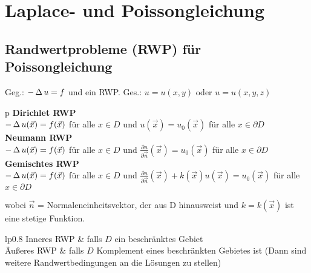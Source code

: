 \documentclass[german,color,5pt]{latex4ei/latex4ei_fs}
\begin{document}
\section{Laplace- und Poissongleichung}
\begin{sectionbox}
	\subsection{Randwertprobleme (RWP) für Poissongleichung}
	\begin{flushleft}
	Geg.: $-\operatorname{\Delta} u = f$ und ein RWP. Ges.: $u=u(x,y)$ oder $u=u(x,y,z)$
	\end{flushleft}
	\begin{tablebox}{p{\textwidth}}
		\textbf{Dirichlet RWP}\\
		$-\operatorname{\Delta} u(\vec x)=f(\vec x) $ für alle $x \in D $ und $u(\vec x)=u_{0}(\vec x) $ für alle $x \in \partial D$ \\
		\textbf{Neumann RWP}\\
		$-\operatorname{\Delta} u(\vec x)=f(\vec x) $ für alle $x \in D $ und $\frac{\partial u}{\partial \vec n}(\vec x)=u_{0}(\vec x) $ für alle $x \in \partial D $ \\
		\textbf{Gemischtes RWP} \\
		$-\operatorname{\Delta} u(\vec x)=f(\vec x) $ für alle $x \in D $ und $\frac{\partial u}{\partial \vec n}(\vec x)+k(\vec x)u(\vec x)=u_{0}(\vec x) $ für alle $x \in \partial D $ \\
	\end{tablebox}
	wobei $\vec n$ = Normaleneinheitsvektor, der aus D hinausweist und $k=k(\vec x)$ ist eine stetige Funktion.
	\begin{tablebox}{lp{0.8\textwidth}}
		Inneres RWP & falls $D$ ein beschränktes Gebiet \\
		Äußeres RWP & falls $D$ Komplement eines beschränkten Gebietes ist (Dann sind weitere Randwertbedingungen an die Lösungen zu stellen)
	\end{tablebox}
\end{sectionbox}
	
\end{document}
